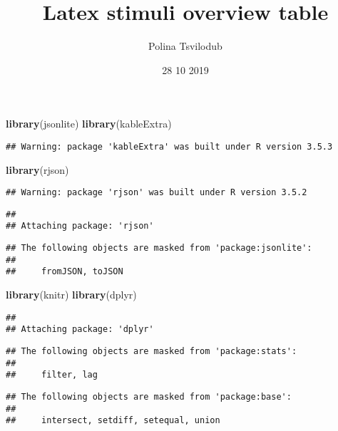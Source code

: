 \documentclass[]{article}
\title{Latex stimuli overview table}
\author{Polina Tsvilodub}
\date{28 10 2019}
\newenvironment{Shaded}{\begin{snugshade}}{\end{snugshade}}
\newcommand{\KeywordTok}[1]{\textcolor[rgb]{0.13,0.29,0.53}{\textbf{#1}}}
\newcommand{\NormalTok}[1]{#1}
\begin{document}
\maketitle

\begin{Shaded}
\begin{Highlighting}[]
\KeywordTok{library}\NormalTok{(jsonlite)}
\KeywordTok{library}\NormalTok{(kableExtra)}
\end{Highlighting}
\end{Shaded}

\begin{verbatim}
## Warning: package 'kableExtra' was built under R version 3.5.3
\end{verbatim}

\begin{Shaded}
\begin{Highlighting}[]
\KeywordTok{library}\NormalTok{(rjson)}
\end{Highlighting}
\end{Shaded}

\begin{verbatim}
## Warning: package 'rjson' was built under R version 3.5.2
\end{verbatim}

\begin{verbatim}
## 
## Attaching package: 'rjson'
\end{verbatim}

\begin{verbatim}
## The following objects are masked from 'package:jsonlite':
## 
##     fromJSON, toJSON
\end{verbatim}

\begin{Shaded}
\begin{Highlighting}[]
\KeywordTok{library}\NormalTok{(knitr)}
\KeywordTok{library}\NormalTok{(dplyr)}
\end{Highlighting}
\end{Shaded}

\begin{verbatim}
## 
## Attaching package: 'dplyr'
\end{verbatim}

\begin{verbatim}
## The following objects are masked from 'package:stats':
## 
##     filter, lag
\end{verbatim}

\begin{verbatim}
## The following objects are masked from 'package:base':
## 
##     intersect, setdiff, setequal, union
\end{verbatim}
\end{document}
